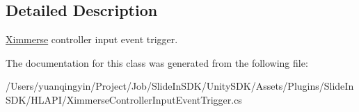 \subsection{Detailed Description}
\mbox{\hyperlink{namespace_ximmerse}{Ximmerse}} controller input event trigger. 



The documentation for this class was generated from the following file\+:\begin{DoxyCompactItemize}
\item 
/\+Users/yuanqingyin/\+Project/\+Job/\+Slide\+In\+S\+D\+K/\+Unity\+S\+D\+K/\+Assets/\+Plugins/\+Slide\+In\+S\+D\+K/\+H\+L\+A\+P\+I/Ximmerse\+Controller\+Input\+Event\+Trigger.\+cs\end{DoxyCompactItemize}
